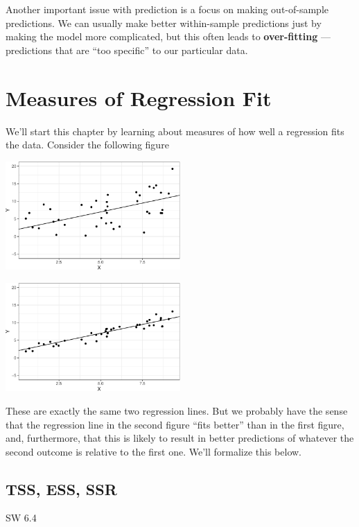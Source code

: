 \documentclass[
  letterpaper,
  DIV=11,
  numbers=noendperiod]{scrreprt}
\begin{document}
Another important issue with prediction is a focus on making
out-of-sample predictions. We can usually make better within-sample
predictions just by making the model more complicated, but this often
leads to \textbf{over-fitting} --- predictions that are ``too specific''
to our particular data.

\section{Measures of Regression Fit}\label{measures-of-regression-fit}

We'll start this chapter by learning about measures of how well a
regression fits the data. Consider the following figure

\includegraphics[width=0.5\textwidth,height=\textheight]{05-prediction_files/figure-pdf/unnamed-chunk-1-1.pdf}

\includegraphics[width=0.5\textwidth,height=\textheight]{05-prediction_files/figure-pdf/unnamed-chunk-1-2.pdf}

These are exactly the same two regression lines. But we probably have
the sense that the regression line in the second figure ``fits better''
than in the first figure, and, furthermore, that this is likely to
result in better predictions of whatever the second outcome is relative
to the first one. We'll formalize this below.

\subsection{TSS, ESS, SSR}\label{tss-ess-ssr}

SW 6.4
\end{document}
